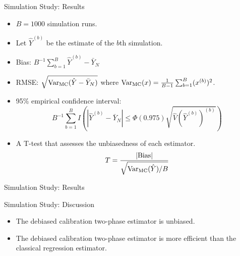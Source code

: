 \documentclass{beamer} %
\newcommand{\Var}{{\text{Var}}}
\begin{document}
\begin{frame}{Simulation Study: Results}

  \begin{itemize}
    \item $B = 1000$ simulation runs.
    \item Let $\hat Y^{(b)}$ be the estimate of the $b$th simulation.
    \item Bias: $B^{-1} \sum_{b = 1}^B \hat Y^{(b)} - \bar Y_N$
    \item RMSE: $\sqrt{\Var_{\rm{MC}}(\hat Y - \bar Y_N)}$ where $\Var_{\rm{MC}}(x) =
      \frac{1}{B-1}\sum_{b = 1}^B (x^{(b)})^2$. 
    \item 95\% empirical confidence interval:
      $$B^{-1} \sum_{b = 1}^{B} I\left(|\hat Y^{(b)} - \bar Y_N| \leq 
      \Phi(0.975)\sqrt{\hat V(\hat Y^{(b)})^{(b)}}\right)$$
    \item A T-test that assesses the unbiasedness of each estimator.
      $$T = \frac{|\text{Bias}|}{\sqrt{\Var_{\rm{MC}}(\hat Y) / B}}$$
  \end{itemize}

\end{frame}

\begin{frame}{Simulation Study: Results}

\begin{table}[ht!]
  \centering

\caption{This table shows the results of the simulation study. It displays the
Bias, RMSE, empirical 95\% confidence interval, and a t-statistic assessing the
unbiasedness of each estimator for the estimators: $\pi^*$, TP-Reg, DC-Pop, and
DC-Est.}
\label{tab:tpdc-mean}
\end{table}

\end{frame}

\begin{frame}{Simulation Study: Discussion}

  \begin{itemize}
    \item The debiased calibration two-phase estimator is unbiased.
    \item The debiased calibration two-phase estimator is more efficient
      than the classical regression estimator.
  \end{itemize}

\end{frame}
\end{document}
